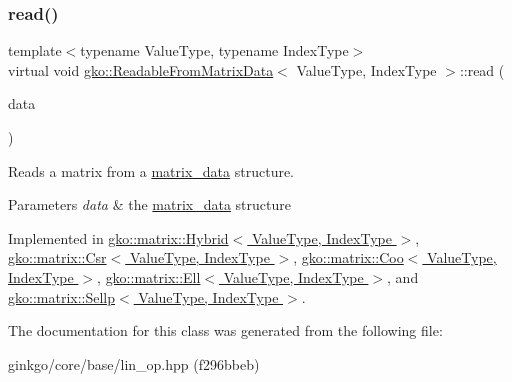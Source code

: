 \subsubsection{\texorpdfstring{read()}{read()}}
{\footnotesize\ttfamily template$<$typename Value\+Type, typename Index\+Type$>$ \\
virtual void \hyperlink{classgko_1_1ReadableFromMatrixData}{gko\+::\+Readable\+From\+Matrix\+Data}$<$ Value\+Type, Index\+Type $>$\+::read (\begin{DoxyParamCaption}\item[{const \hyperlink{structgko_1_1matrix__data}{matrix\+\_\+data}$<$ Value\+Type, Index\+Type $>$ \&}]{data }\end{DoxyParamCaption})\hspace{0.3cm}{\ttfamily [pure virtual]}}



Reads a matrix from a \hyperlink{structgko_1_1matrix__data}{matrix\+\_\+data} structure. 


\begin{DoxyParams}{Parameters}
{\em data} & the \hyperlink{structgko_1_1matrix__data}{matrix\+\_\+data} structure \\
\hline
\end{DoxyParams}


Implemented in \hyperlink{classgko_1_1matrix_1_1Hybrid_a7eff2922ae21e9722b343ca1832d8bf5}{gko\+::matrix\+::\+Hybrid$<$ Value\+Type, Index\+Type $>$}, \hyperlink{classgko_1_1matrix_1_1Csr_ac4db41146ed3c3a8653b03d6b2c6c675}{gko\+::matrix\+::\+Csr$<$ Value\+Type, Index\+Type $>$}, \hyperlink{classgko_1_1matrix_1_1Coo_ac0d4aeb19d9f55b62bea18bad1a408f5}{gko\+::matrix\+::\+Coo$<$ Value\+Type, Index\+Type $>$}, \hyperlink{classgko_1_1matrix_1_1Ell_a2c877d9f7bbc57f97df5ab443954a6fd}{gko\+::matrix\+::\+Ell$<$ Value\+Type, Index\+Type $>$}, and \hyperlink{classgko_1_1matrix_1_1Sellp_a2c5ff4a3f190daf7d70bbd8451d13edd}{gko\+::matrix\+::\+Sellp$<$ Value\+Type, Index\+Type $>$}.



The documentation for this class was generated from the following file\+:\begin{DoxyCompactItemize}
\item 
ginkgo/core/base/lin\+\_\+op.\+hpp (f296bbeb)\end{DoxyCompactItemize}
